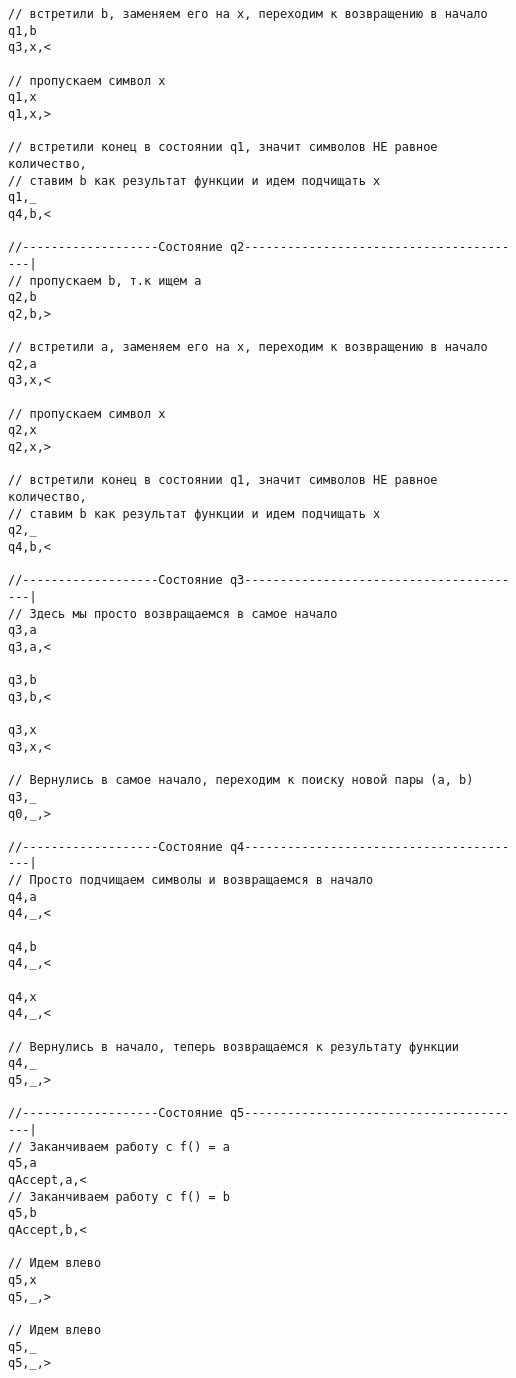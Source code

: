 \documentclass[a4paper,12pt]{article}
\begin{document}
\begin{verbatim}
// встретили b, заменяем его на x, переходим к возвращению в начало
q1,b
q3,x,<

// пропускаем символ x
q1,x
q1,x,>

// встретили конец в состоянии q1, значит символов НЕ равное количество,
// ставим b как результат функции и идем подчищать x
q1,_
q4,b,<

//-------------------Состояние q2----------------------------------------|
// пропускаем b, т.к ищем a
q2,b
q2,b,>

// встретили a, заменяем его на x, переходим к возвращению в начало
q2,a
q3,x,<

// пропускаем символ x
q2,x
q2,x,>

// встретили конец в состоянии q1, значит символов НЕ равное количество,
// ставим b как результат функции и идем подчищать x
q2,_
q4,b,<

//-------------------Состояние q3----------------------------------------|
// Здесь мы просто возвращаемся в самое начало
q3,a
q3,a,<

q3,b
q3,b,<

q3,x
q3,x,<

// Вернулись в самое начало, переходим к поиску новой пары (a, b)
q3,_
q0,_,>

//-------------------Состояние q4----------------------------------------|
// Просто подчищаем символы и возвращаемся в начало
q4,a
q4,_,<

q4,b
q4,_,<

q4,x
q4,_,<

// Вернулись в начало, теперь возвращаемся к результату функции
q4,_
q5,_,>

//-------------------Состояние q5----------------------------------------|
// Заканчиваем работу с f() = a
q5,a
qAccept,a,<
// Заканчиваем работу с f() = b
q5,b
qAccept,b,<

// Идем влево
q5,x
q5,_,>

// Идем влево
q5,_
q5,_,>
\end{verbatim}
\end{document}
